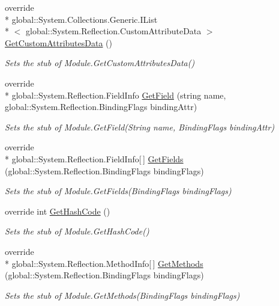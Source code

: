 \begin{DoxyCompactItemize}
override \\*
global\-::\-System.\-Collections.\-Generic.\-I\-List\\*
$<$ global\-::\-System.\-Reflection.\-Custom\-Attribute\-Data $>$ \hyperlink{class_system_1_1_reflection_1_1_fakes_1_1_stub_module_afe61bd58bc8a877072579ade52126d91}{Get\-Custom\-Attributes\-Data} ()
\begin{DoxyCompactList}\small\item\em Sets the stub of Module.\-Get\-Custom\-Attributes\-Data()\end{DoxyCompactList}\item 
override \\*
global\-::\-System.\-Reflection.\-Field\-Info \hyperlink{class_system_1_1_reflection_1_1_fakes_1_1_stub_module_a288d6964ff06b2ba4502ac0552c86301}{Get\-Field} (string name, global\-::\-System.\-Reflection.\-Binding\-Flags binding\-Attr)
\begin{DoxyCompactList}\small\item\em Sets the stub of Module.\-Get\-Field(\-String name, Binding\-Flags binding\-Attr)\end{DoxyCompactList}\item 
override \\*
global\-::\-System.\-Reflection.\-Field\-Info\mbox{[}$\,$\mbox{]} \hyperlink{class_system_1_1_reflection_1_1_fakes_1_1_stub_module_ab308f838a92dee92cfe51adf495f100b}{Get\-Fields} (global\-::\-System.\-Reflection.\-Binding\-Flags binding\-Flags)
\begin{DoxyCompactList}\small\item\em Sets the stub of Module.\-Get\-Fields(\-Binding\-Flags binding\-Flags)\end{DoxyCompactList}\item 
override int \hyperlink{class_system_1_1_reflection_1_1_fakes_1_1_stub_module_aa54a043b29def5081cf9fda1f53d5385}{Get\-Hash\-Code} ()
\begin{DoxyCompactList}\small\item\em Sets the stub of Module.\-Get\-Hash\-Code()\end{DoxyCompactList}\item 
override \\*
global\-::\-System.\-Reflection.\-Method\-Info\mbox{[}$\,$\mbox{]} \hyperlink{class_system_1_1_reflection_1_1_fakes_1_1_stub_module_ae1c83b2ec0bfe29ad1740cc8fc3358b1}{Get\-Methods} (global\-::\-System.\-Reflection.\-Binding\-Flags binding\-Flags)
\begin{DoxyCompactList}\small\item\em Sets the stub of Module.\-Get\-Methods(\-Binding\-Flags binding\-Flags)\end{DoxyCompactList}\item 

\end{DoxyCompactItemize}
